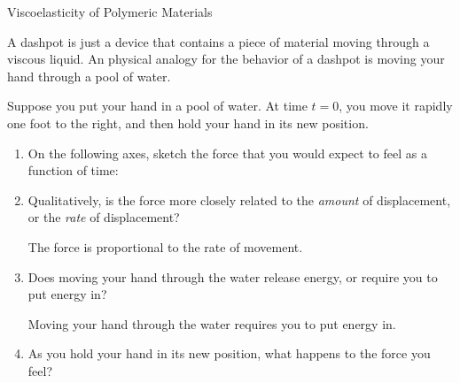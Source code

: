 \begin{activity}{Viscoelasticity of Polymeric Materials}
\begin{model}
	A dashpot is just a device that contains a piece of material moving through a viscous liquid. An physical analogy for the behavior of a dashpot is moving your hand through a pool of water.
	
\end{model}

\begin{ctqs}
	
	\question  Suppose you put your hand in a pool of water. At time $t=0$, you move it rapidly one foot to the right, and then hold your hand in its new position.\label{\labelbase:ctq:poolstepstrain}
	
		\begin{enumerate}
			\item On the following axes, sketch the force that you would expect to feel as a function of time:
			
				\begin{solution}[1.5in]
				\end{solution}
			
			\item Qualitatively, is the force more closely related to the \emph{amount} of displacement, or the \emph{rate} of displacement?
			
				\begin{solution}[1.2in]
					The force is proportional to the rate of movement.
				\end{solution}
			
			\item Does moving your hand through the water release energy, or require you to put energy in?
			
				\begin{solution}[1.2in]
					Moving your hand through the water requires you to put energy in.
				\end{solution}
				
			\item As you hold your hand in its new position, what happens to the force you feel?
			

\end{enumerate}
\end{ctqs}
\end{activity}
